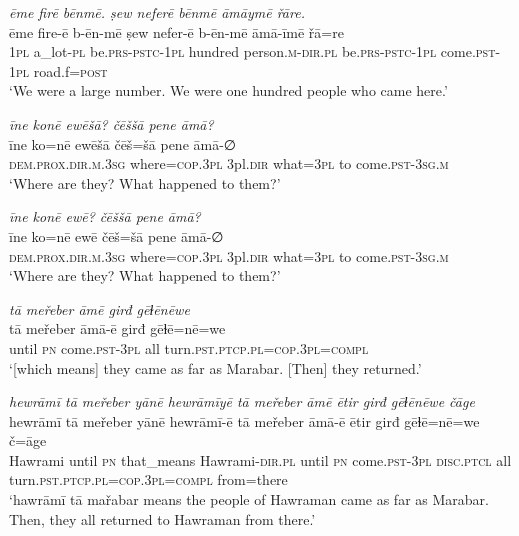 \ea \label{BP.110}
\textit{ēme firē bēnmē. ṣew neferē bēnmē āmāymē řāre.} \\ 
\gll ēme fire-ē b-ēn-mē ṣew nefer-ē b-ēn-mē āmā-īmē řā=re \\ 
 \textsc{1pl} a\_lot\textsc{-pl} be.\textsc{prs}\textsc{-pstc}\textsc{-\textsc{1pl}} hundred person\textsc{.m}\textsc{-dir.pl} be.\textsc{prs}\textsc{-pstc}\textsc{-\textsc{1pl}} come\textsc{.pst}-\textsc{1pl} road.f\textsc{=\textsc{post}} \\ 
\glt `We were a large number. We were one hundred  people who came here.'
\z 
 
\ea \label{BP.111}
\textit{īne konē ewēšā? čēššā pene āmā?} \\ 
\gll īne ko=nē ewēšā čēš=šā pene āmā-∅ \\ 
 \textsc{dem.prox}\textsc{.dir}\textsc{.m}\textsc{.3sg} where\textsc{=cop}\textsc{.3pl} 3pl\textsc{.dir} what\textsc{=3pl} to come\textsc{.pst}\textsc{-3sg}\textsc{.m} \\ 
\glt `Where are they? What happened to them?'
\z 
 
\ea \label{BP.112}
\textit{īne konē ewē? čēššā pene āmā?} \\ 
\gll īne ko=nē ewē čēš=šā pene āmā-∅ \\ 
 \textsc{dem.prox}\textsc{.dir}\textsc{.m}\textsc{.3sg} where\textsc{=cop}\textsc{.3pl} 3pl\textsc{.dir} what\textsc{=3pl} to come\textsc{.pst}\textsc{-3sg}\textsc{.m} \\ 
\glt `Where are they? What happened to them?'
\z 
 
\ea \label{BP.114}
\textit{tā meřeber āmē girđ gēɫēnēwe} \\ 
\gll tā meřeber āmā-ē girđ gēɫē=nē=we \\ 
 until \textsc{pn} come\textsc{.pst}\textsc{-3pl} all turn\textsc{.pst}\textsc{.ptcp}\textsc{.pl}\textsc{=cop}\textsc{.3pl}\textsc{=compl} \\ 
\glt `[which means] they came as far as Marabar. [Then] they returned.'
\z 
 
\ea \label{BP.115}
\textit{hewrāmī tā meřeber yānē hewrāmīyē tā meřeber āmē ētir girđ gēɫēnēwe čāge} \\ 
\gll hewrāmī tā meřeber yānē hewrāmī-ē tā meřeber āmā-ē ētir girđ gēɫē=nē=we č=āge \\ 
 Hawrami until \textsc{pn} that\_means Hawrami\textsc{-dir}\textsc{.pl} until \textsc{pn} come\textsc{.pst}\textsc{-3pl} \textsc{disc.ptcl} all turn\textsc{.pst}\textsc{.ptcp}\textsc{.pl}\textsc{=cop}\textsc{.3pl}\textsc{=compl} from=there \\ 
\glt `hawrāmī tā mařabar means the people of Hawraman came as far as Marabar. Then, they all returned to Hawraman from there.'
\z 
 
